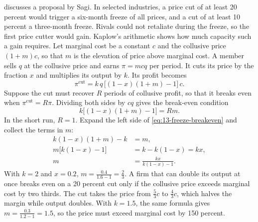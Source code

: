 \begin{example}\label{ex:13-price-freeze}
\citet[pp.~267--268, note~22]{Kaplow2013} discusses a proposal by Sagi. In selected industries, a price cut
of at least 20 percent would trigger a six-month freeze of all prices, and a cut of at least 10 percent a
three-month freeze. Rivals could not retaliate during the freeze, so the first price cutter would gain. Kaplow's
arithmetic shows how much capacity such a gain requires. Let marginal cost be a constant $c$ and the collusive
price $(1 + m)c$, so that $m$ is the elevation of price above marginal cost. A member sells $q$ at the collusive
price and earns $\pi = mcq$ per period. It cuts its price by the fraction $x$ and multiplies its output by $k$. Its
profit becomes
\begin{equation*}
  \pi^{\mathrm{cut}} = k\,q\,\bigl[(1 - x)(1 + m) - 1\bigr]\,c .
\end{equation*}
Suppose the cut must recover $R$ periods of collusive profit, so that it breaks even when $\pi^{\mathrm{cut}} = R\pi$.
Dividing both sides by $cq$ gives the break-even condition
\begin{equation}\label{eq:13-freeze-breakeven}
  k\bigl[(1 - x)(1 + m) - 1\bigr] = Rm .
\end{equation}
In the short run, $R = 1$. Expand the left side of \eqref{eq:13-freeze-breakeven} and collect the terms in $m$:
\begin{align*}
  k(1 - x)(1 + m) - k &= m ,\\
  m\bigl[k(1 - x) - 1\bigr] &= k - k(1 - x) = kx ,\\
  m &= \frac{kx}{k(1 - x) - 1} .
\end{align*}
With $k = 2$ and $x = 0.2$, $m = \frac{0.4}{1.6 - 1} = \frac{2}{3}$. A firm that can double its output at once breaks
even on a 20 percent cut only if the collusive price exceeds marginal cost by two thirds. The cut takes the price
from $\frac{5}{3}c$ to $\frac{4}{3}c$, which halves the margin while output doubles. With $k = 1.5$, the same formula
gives $m = \frac{0.3}{1.2 - 1} = 1.5$, so the price must exceed marginal cost by 150 percent.


\end{example}
